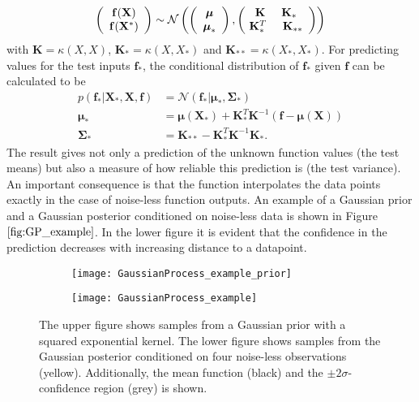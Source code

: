 \documentclass[../main.tex]{subfiles}
\begin{document}
\begin{equation}
    \left(
    \begin{array}{c}
      \mathbf{f(\mathbf{X})} \\\mathbf{f(\mathbf{X^*})}
    \end{array}
 \right) \sim \mathcal{N}
 \left(\left( 
  \begin{array}{c}
  \boldsymbol{\mu} \\ \boldsymbol{\mu}_* 
  \end{array}
  \right),
  \left(\!
  \begin{array}{c}
  \mathbf{K} \hspace{0.5cm} \mathbf{K}_* \\
  \mathbf{K}^T_* \hspace{0.5cm} \mathbf{K}_{**}  
  \end{array}
  \right)
  \right)
\end{equation}
with $\mathbf{K} = \kappa(X,X)$, $\mathbf{K_*} = \kappa(X,X_*)$ and $\mathbf{K_{**}} = \kappa(X_*,X_*)$. For predicting values for the test inputs $\mathbf{f}_*$, the conditional distribution of $\mathbf{f}_*$ given $\mathbf{f}$ can be calculated to be
\begin{align}
    p(\mathbf{f}_*|\mathbf{X}_*,\mathbf{X},\mathbf{f}) &= \mathcal{N}(\mathbf{f}_*|\boldsymbol{\mu}_*,\boldsymbol{\Sigma}_*)\\
    \boldsymbol{\mu}_* &= \boldsymbol{\mu}(\mathbf{X}_*)+\mathbf{K}^T_*\mathbf{K}^{-1}(\mathbf{f}-\boldsymbol{\mu}(\mathbf{X}))\\
    \boldsymbol{\Sigma}_* &= \mathbf{K}_{**} - \mathbf{K}^T_*\mathbf{K}^{-1}\mathbf{K}_*.
\end{align}
The result gives not only a prediction of the unknown function values (the test means) but also a measure of how reliable this prediction is (the test variance). An important consequence is that the function interpolates the data points exactly in the case of noise-less function outputs. An example of a Gaussian prior and a Gaussian posterior conditioned on noise-less data is shown in Figure $\ref{fig:GP_example}$. In the lower figure it is evident that the confidence in the prediction decreases with increasing distance to a datapoint.\par

\begin{figure}
    \centering
    \begin{subfigure}[b]{\textwidth}
    \texttt{[image: GaussianProcess\_example\_prior]}
    \end{subfigure}
    
    \begin{subfigure}[b]{\textwidth}
    \texttt{[image: GaussianProcess\_example]}
    \end{subfigure}
    \caption{The upper figure shows samples from a Gaussian prior with a squared exponential kernel. The lower figure shows samples from the Gaussian posterior conditioned on four noise-less observations (yellow). Additionally, the mean function (black) and the $\pm 2 \sigma$-confidence region (grey) is shown.}    
    \label{fig:GP_example}
\end{figure}
\end{document}
